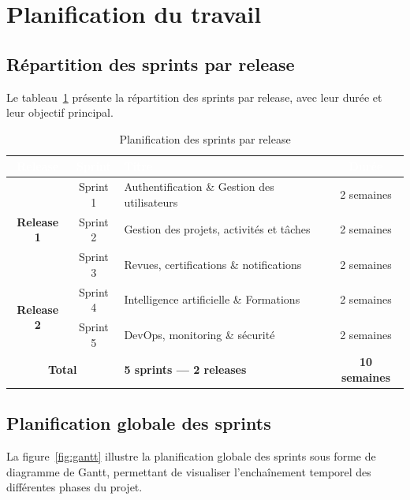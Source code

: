 \section{Planification du travail}
\label{sec:planification}

\subsection{Répartition des sprints par release}

Le tableau~\ref{tab:sprints} présente la répartition des sprints par release, avec leur
durée et leur objectif principal.

\begin{table}[H]
  \centering
  \caption{Planification des sprints par release}
  \label{tab:sprints}
  \renewcommand{\arraystretch}{1.5}
  \begin{tabularx}{\textwidth}{|c|c|X|c|}
    \hline
    \rowcolor{tablehead}
    \textcolor{white}{\textbf{Release}} &
    \textcolor{white}{\textbf{Sprint}} &
    \textcolor{white}{\textbf{Titre}} &
    \textcolor{white}{\textbf{Durée}} \\
    \hline
    \multirow{3}{*}{\textbf{Release 1}} &
    Sprint 1 & Authentification \& Gestion des utilisateurs & 2 semaines \\
    \cline{2-4}
    & Sprint 2 & Gestion des projets, activités et tâches & 2 semaines \\
    \cline{2-4}
    & Sprint 3 & Revues, certifications \& notifications & 2 semaines \\
    \hline
    \multirow{2}{*}{\textbf{Release 2}} &
    Sprint 4 & Intelligence artificielle \& Formations & 2 semaines \\
    \cline{2-4}
    & Sprint 5 & DevOps, monitoring \& sécurité & 2 semaines \\
    \hline
    \multicolumn{2}{|c|}{\textbf{Total}} &
    \textbf{5 sprints — 2 releases} & \textbf{10 semaines} \\
    \hline
  \end{tabularx}
\end{table}

\subsection{Planification globale des sprints}

La figure~\ref{fig:gantt} illustre la planification globale des sprints sous forme de
diagramme de Gantt, permettant de visualiser l'enchaînement temporel des différentes
phases du projet.

